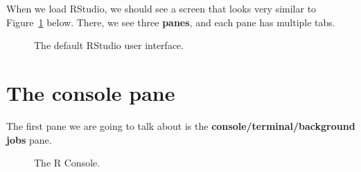 \documentclass[
  letterpaper,
  DIV=11,
  numbers=noendperiod]{scrreprt}
\begin{document}
When we load RStudio, we should see a screen that looks very similar to
Figure~\ref{fig-rstudio} below. There, we see three \textbf{panes}, and
each pane has multiple tabs.

\begin{figure}


\caption{\label{fig-rstudio}The default RStudio user interface.}

\end{figure}%

\section{The console pane}\label{the-console-pane}

The first pane we are going to talk about is the
\textbf{console/terminal/background jobs} pane.

\begin{figure}


\caption{\label{fig-console}The R Console.}

\end{figure}%
\end{document}
